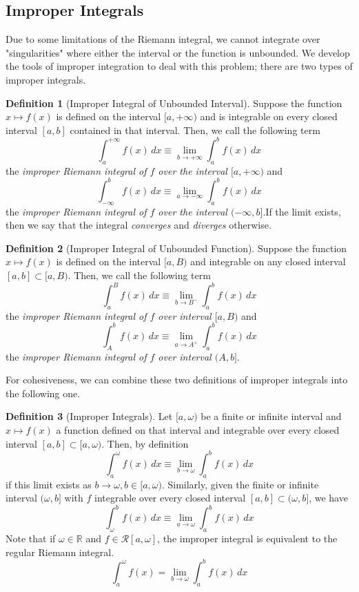 \documentclass{article}
\theoremstyle{remark}
\theoremstyle{definition}
\newtheorem{definition}{Definition}[section]
\begin{document}
\subsection{Improper Integrals}
Due to some limitations of the Riemann integral, we cannot integrate over "singularities" where either the interval or the function is unbounded. We develop the tools of improper integration to deal with this problem; there are two types of improper integrals. 

\begin{definition}[Improper Integral of Unbounded Interval]
Suppose the function $x \mapsto f(x)$ is defined on the interval $[a, +\infty)$ and is integrable on every closed interval $[a, b]$ contained in that interval. Then, we call the following term
\[\int_a^{+\infty} f(x)\,dx \equiv \lim_{b \rightarrow + \infty} \int_a^b f(x)\,dx\]
the \textit{improper Riemann integral of $f$ over the interval $[a, +\infty)$} and 
\[\int_{-\infty}^b f(x)\,dx \equiv \lim_{a \rightarrow -\infty} \int_a^b f(x)\,dx \]
the \textit{improper Riemann integral of $f$ over the interval $(-\infty, b]$}.If the limit exists, then we say that the integral \textit{converges} and \textit{diverges} otherwise. 
\end{definition}

\begin{definition}[Improper Integral of Unbounded Function]
Suppose the function $x \mapsto f(x)$ is defined on the interval $[a, B)$ and integrable on any closed interval $[a, b] \subset [a, B)$. Then, we call the following term
\[\int_a^B f(x)\,dx \equiv \lim_{b \rightarrow B^-} \int_a^b f(x)\,dx\]
the \textit{improper Riemann integral of $f$ over interval $[a, B)$} and
\[\int_A^b f(x)\,dx \equiv \lim_{a \rightarrow A^+} \int_a^b f(x)\,dx\]
the \textit{improper Riemann integral of $f$ over interval $(A,b]$}.
\end{definition}

For cohesiveness, we can combine these two definitions of improper integrals into the following one. 

\begin{definition}[Improper Integrals]
Let $[a, \omega)$ be a finite or infinite interval and $x \mapsto f(x)$ a function defined on that interval and integrable over every closed interval $[a, b] \subset [a, \omega)$. Then, by definition
\[\int_a^\omega f(x)\,dx \equiv \lim_{b \rightarrow \omega} \int_a^b f(x)\,dx\]
if this limit exists as $b \rightarrow \omega, b \in [a, \omega)$. Similarly, given the finite or infinite interval $(\omega, b]$ with $f$ integrable over every closed interval $[a, b] \subset (\omega, b]$, we have
\[\int_\omega^b f(x)\,dx \equiv \lim_{a \rightarrow \omega} \int_a^b f(x)\,dx\]
Note that if $\omega \in \mathbb{R}$ and $f \in \mathcal{R}[a, \omega]$, the improper integral is equivalent to the regular Riemann integral. 
\[\int_a^\omega f(x) = \lim_{b\rightarrow \omega} \int_a^b f(x)\,dx\]
\end{definition}
\end{document}
